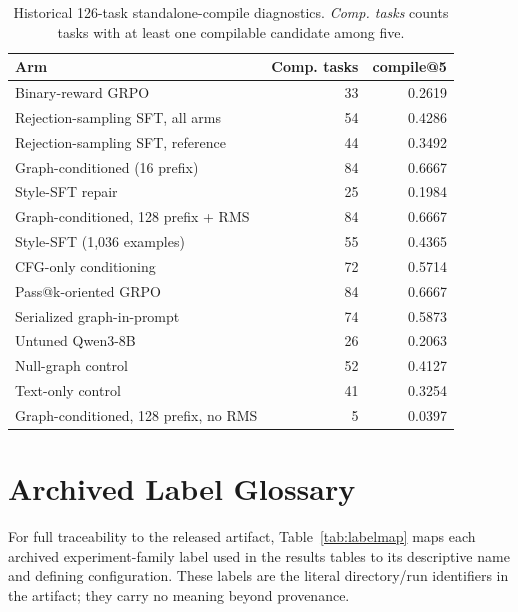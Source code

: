 \documentclass[11pt]{article}
\begin{document}
\begin{table}[h]
\centering
\small
\caption{Historical 126-task standalone-compile diagnostics. \emph{Comp. tasks} counts tasks with at least one compilable candidate among five.}
\label{tab:legacycompile}
\begin{tabular}{lrr}
\toprule
Arm & Comp. tasks & compile@5 \\
\midrule
Binary-reward GRPO & 33 & 0.2619 \\
Rejection-sampling SFT, all arms & 54 & 0.4286 \\
Rejection-sampling SFT, reference & 44 & 0.3492 \\
Graph-conditioned (16 prefix) & 84 & 0.6667 \\
Style-SFT repair & 25 & 0.1984 \\
Graph-conditioned, 128 prefix + RMS & 84 & 0.6667 \\
Style-SFT (1{,}036 examples) & 55 & 0.4365 \\
CFG-only conditioning & 72 & 0.5714 \\
Pass@k-oriented GRPO & 84 & 0.6667 \\
Serialized graph-in-prompt & 74 & 0.5873 \\
Untuned Qwen3-8B & 26 & 0.2063 \\
Null-graph control & 52 & 0.4127 \\
Text-only control & 41 & 0.3254 \\
Graph-conditioned, 128 prefix, no RMS & 5 & 0.0397 \\
\bottomrule
\end{tabular}
\end{table}

\section{Archived Label Glossary}
\label{app:labels}

For full traceability to the released artifact, Table~\ref{tab:labelmap} maps each archived experiment-family label used in the results tables to its descriptive name and defining configuration. These labels are the literal directory/run identifiers in the artifact; they carry no meaning beyond provenance.
\end{document}
